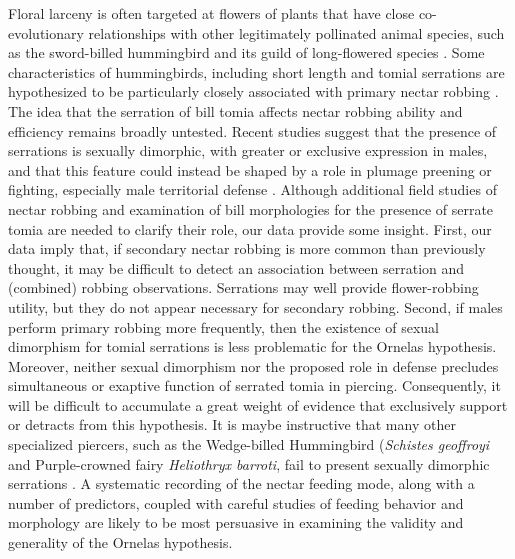 \documentclass[fleqn,10pt,lineno]{wlpeerj}
\begin{document}
%
%

Floral larceny is often targeted at flowers of plants that have close co-evolutionary relationships with other legitimately pollinated animal species, such as the sword-billed hummingbird and its guild of long-flowered species \citep{soteras2018}. 
Some characteristics of hummingbirds, including short length and tomial serrations are hypothesized to be particularly closely associated with primary nectar robbing \citep{ornelas1994}.
The idea that the serration of bill tomia affects nectar robbing ability and efficiency remains broadly untested. 
Recent studies suggest that the presence of serrations is sexually dimorphic, with greater or exclusive expression in males, and that this feature could instead be shaped by a role in plumage preening or fighting, especially male territorial defense \citep{rico-guevara2019}. 
Although additional field studies of nectar robbing and examination of bill morphologies for the presence of serrate tomia are needed to clarify their role, our data provide some insight.  
First, our data imply that, if secondary nectar robbing is more common than previously thought, it may be difficult to detect an association between serration and (combined) robbing observations.
Serrations may well provide flower-robbing utility, but they do not appear necessary for secondary robbing.
Second, if males perform primary robbing more frequently, then the existence of sexual dimorphism for tomial serrations is less problematic for the Ornelas hypothesis.
Moreover, neither sexual dimorphism nor the proposed role in defense precludes simultaneous or exaptive function of serrated tomia in piercing. 
Consequently, it will be difficult to accumulate a great weight of evidence that exclusively support or detracts from this hypothesis.
It is maybe instructive that many other specialized piercers, such as the Wedge-billed Hummingbird (\textit{Schistes geoffroyi} and Purple-crowned fairy \textit{Heliothryx barroti}, fail to present sexually dimorphic serrations \citep{rico-guevara2019}. 
A systematic recording of the nectar feeding mode, along with a number of predictors, coupled with careful studies of feeding behavior and morphology are likely to be most persuasive in examining the validity and generality of the Ornelas hypothesis.
\end{document}
